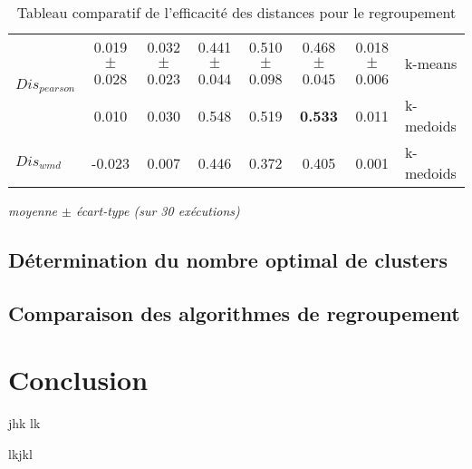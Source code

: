 \begin{table}[!htb]
\begin{tabular}{|l||c|c||c|c|c||c||l|}
		\multirow{2}{*}{$Dis_{pearson}$} & 0.019$\pm$0.028 & 0.032$\pm$0.023 & 0.441$\pm$0.044 & 0.510$\pm$0.098 & 0.468$\pm$0.045 & 0.018$\pm$0.006 & k-means \\
		& 0.010 & 0.030 & 0.548 & 0.519 & \textbf{0.533} & 0.011 & k-medoids \\ \hline
		
		
		$Dis_{wmd}$ & -0.023 & 0.007 & 0.446 & 0.372 & 0.405 & 0.001 & k-medoids \\ \hline	
		
	\end{tabular}

	\textit{moyenne $\pm$ écart-type (sur 30 exécutions)}
	\caption{Tableau comparatif de l'efficacité des distances pour le regroupement}\label{tab:similarite:compare-dist-1}
\end{table}

\subsection{Détermination du nombre optimal de clusters}


\subsection{Comparaison des algorithmes de regroupement}


\section{Conclusion}
\label{sec:similarite:conclusion}
jhk
lk

lkjkl